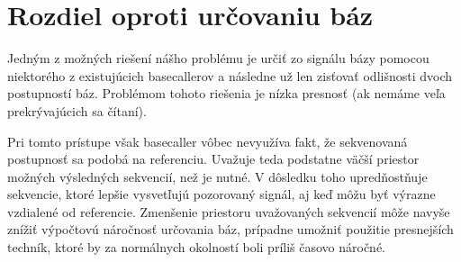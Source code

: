 \section{Rozdiel oproti určovaniu báz}

Jedným z možných riešení nášho problému je určiť zo signálu bázy pomocou niektorého z existujúcich 
basecallerov a následne už len zisťovať odlišnosti dvoch postupností báz. Problémom tohoto riešenia
je nízka presnosť (ak nemáme veľa prekrývajúcich sa čítaní). 

Pri tomto prístupe však basecaller vôbec
nevyužíva fakt, že sekvenovaná postupnosť sa podobá na referenciu. Uvažuje teda podstatne väčší 
priestor možných výsledných sekvencií, než je nutné. V dôsledku toho upredňostňuje sekvencie, ktoré 
lepšie vysvetľujú pozorovaný signál, aj keď môžu byť výrazne vzdialené od referencie.
Zmenšenie priestoru uvažovaných sekvencií môže navyše znížiť výpočtovú náročnosť určovania báz, prípadne
umožniť použitie presnejších techník, ktoré by za normálnych okolností boli príliš časovo náročné.
